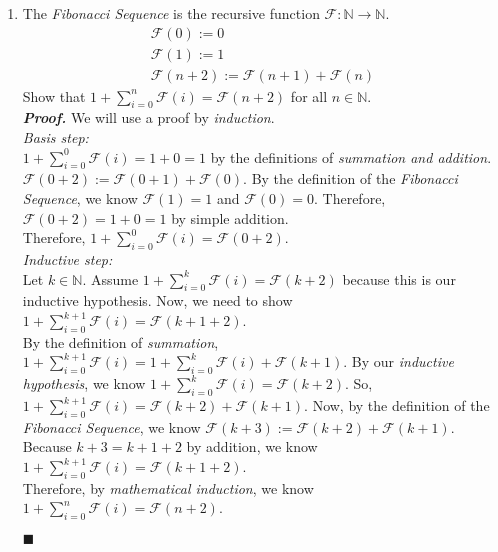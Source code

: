 \documentclass[11pt,a4paper]{article}
\begin{document}
\begin{enumerate}
    \item 
    The \emph{Fibonacci Sequence} is the recursive function $\mathcal{F}: \mathbb{N} \rightarrow \mathbb{N}$.
    \begin{align*}
        \mathcal{F}(0) := 0 \\
        \mathcal{F}(1) := 1 \\
        \mathcal{F}(n + 2) := \mathcal{F}(n + 1) + \mathcal{F}(n)
    \end{align*}
    Show that $1 + \displaystyle\sum_{i = 0}^{n} \mathcal{F}(i) = \mathcal{F}(n + 2)$ for all $n \in \mathbb{N}$. \\
    \emph{\textbf{Proof.}} We will use a proof by \emph{induction}. \\
    \emph{Basis step:} \\
    $1 + \displaystyle\sum_{i = 0}^{0} \mathcal{F}(i) = 1 + 0 = 1$ by the definitions of \emph{summation and addition}. \\
    $\mathcal{F}(0 + 2) := \mathcal{F}(0 + 1) + \mathcal{F}(0) $. By the definition of the \emph{Fibonacci Sequence}, we know $\mathcal{F}(1) = 1 $ and $\mathcal{F}(0) = 0 $. 
    Therefore, $\mathcal{F}(0 + 2) = 1 + 0 = 1 $ by simple addition. \\
    Therefore, $1 + \displaystyle\sum_{i = 0}^{0} \mathcal{F}(i) =\mathcal{F}(0 + 2) $. \\
    \emph{Inductive step:} \\
    Let $k \in \mathbb{N} $. Assume $1 + \displaystyle\sum_{i = 0}^{k} \mathcal{F}(i) =\mathcal{F}(k + 2) $ because this is our inductive hypothesis.
    Now, we need to show $1 + \displaystyle\sum_{i = 0}^{k + 1} \mathcal{F}(i) =\mathcal{F}(k + 1 + 2) $. \\
    By the definition of \emph{summation}, $1 + \displaystyle\sum_{i = 0}^{k + 1} \mathcal{F}(i) = 1 + \displaystyle\sum_{i = 0}^{k} \mathcal{F}(i) + \mathcal{F}(k + 1)$.
    By our \emph{inductive hypothesis}, we know $1 + \displaystyle\sum_{i = 0}^{k} \mathcal{F}(i) = \mathcal{F}(k + 2) $. So, $1 + \displaystyle\sum_{i = 0}^{k + 1} \mathcal{F}(i) = \mathcal{F}(k + 2) + \mathcal{F}(k + 1)$.
    Now, by the definition of the \emph{Fibonacci Sequence}, we know $\mathcal{F}(k + 3) := \mathcal{F}(k + 2) + \mathcal{F}(k + 1)$. Because $k + 3 = k + 1 + 2 $ by addition, we know 
    $1 + \displaystyle\sum_{i = 0}^{k + 1} \mathcal{F}(i) =\mathcal{F}(k + 1 + 2) $. \\
    Therefore, by \emph{mathematical induction}, we know $1 + \displaystyle\sum_{i = 0}^{n} \mathcal{F}(i) = \mathcal{F}(n + 2)$.
    \begin{flushright}
        $\blacksquare$
    \end{flushright}
\end{enumerate}
\end{document}
